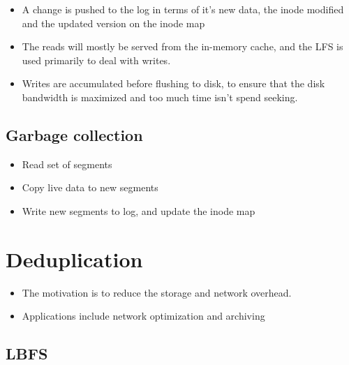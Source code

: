 \documentclass[a4paper]{article}
\begin{document}
\begin{itemize}
\item
    A change is pushed to the log in terms of it's new data, the inode
    modified and the updated version on the inode map
\item
    The reads will mostly be served from the in-memory cache, and the LFS
    is used primarily to deal with writes.
\item
    Writes are accumulated before flushing to disk, to ensure that the
    disk bandwidth is maximized and too much time isn't spend seeking.
\end{itemize}

\subsection{Garbage collection}

\begin{itemize}
\item
    Read set of segments
\item
    Copy live data to new segments
\item
    Write new segments to log, and update the inode map
\end{itemize}

\newpage

\section{Deduplication}

\begin{itemize}
\item
    The motivation is to reduce the storage and network overhead.
\item
    Applications include network optimization and archiving
\end{itemize}

\subsection{LBFS}
\end{document}
